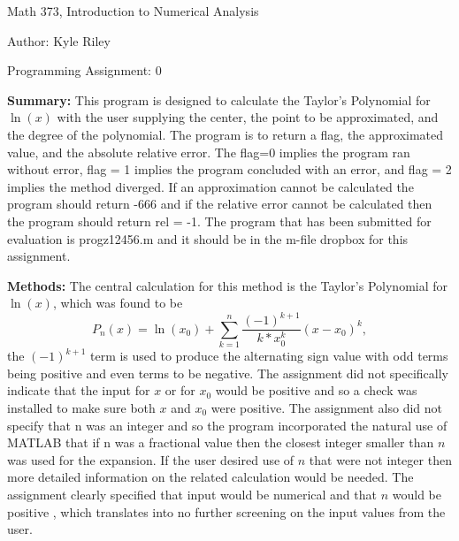 \documentclass{article}
\def\ds{\displaystyle}
\begin{document}

\large

{\Large Math 373, Introduction to Numerical Analysis}

\begin{center}
{\Large Author: \hfill Kyle Riley} 
\end{center}
\par \medskip \par
{\Large Programming Assignment: 0}  
\par \bigskip \par

{\bf Summary:} This program is designed to calculate the Taylor's Polynomial for $\ln(x)$ with the user supplying the center, the point to be approximated, and the degree of the polynomial. The program is to return a flag, the approximated value, and the absolute relative error. The flag=0 implies the program ran without error, flag = 1 implies the program concluded with an error, and flag = 2 implies the method diverged. If an approximation cannot be calculated the program should return -666 and if the relative error cannot be calculated then the program should return rel = -1.  The program that has been submitted for evaluation is progz12456.m and it should be in the m-file dropbox for this assignment. 
\par \bigskip \par

{\bf Methods:} The central calculation for this method is the Taylor's Polynomial for $\ln(x)$, which was found to be
$$P_n(x) = \ln(x_0) + \sum_{k=1}^n\frac {(-1)^{k+1}}{k*x_0^k}(x-x_0)^k,$$
the $\ds (-1)^{k+1}$ term is used to produce the alternating sign value with odd terms being positive and even terms to be negative. The assignment did not specifically indicate that the input for $x$ or for $x_0$ would be positive and so a check was installed to make sure both $x$ and $x_0$ were positive. The assignment also did not specify that n was an integer and so the program incorporated the natural use of MATLAB that if n was a fractional value then the closest integer smaller than $n$ was used for the expansion. If the user desired use of $n$ that were not integer then more detailed information on the related calculation would be needed. The assignment clearly specified that input would be numerical and that $n$ would be positive , which translates into no further screening on the input values from the user. 
\end{document}
